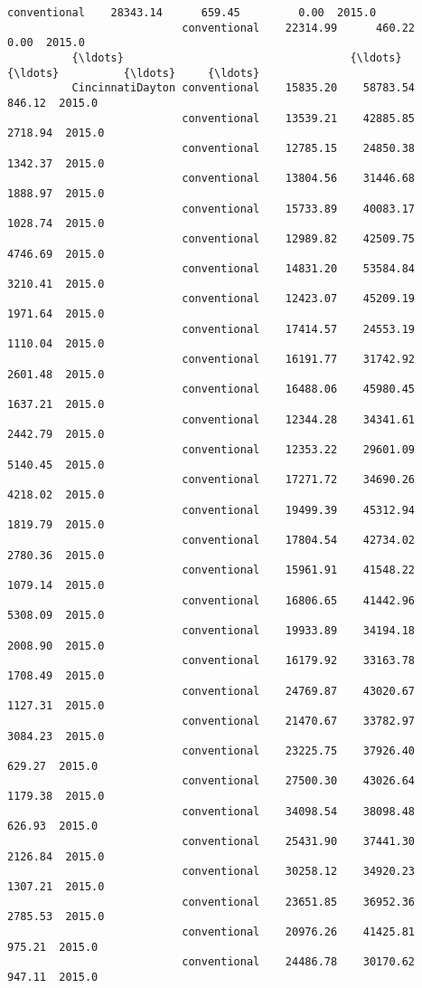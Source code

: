\documentclass[11pt]{article}
\begin{document}
\begin{Verbatim}[commandchars=\\\{\}]
                           conventional    28343.14      659.45         0.00  2015.0   
                           conventional    22314.99      460.22         0.00  2015.0   
          {\ldots}                                   {\ldots}         {\ldots}          {\ldots}     {\ldots}   
          CincinnatiDayton conventional    15835.20    58783.54       846.12  2015.0   
                           conventional    13539.21    42885.85      2718.94  2015.0   
                           conventional    12785.15    24850.38      1342.37  2015.0   
                           conventional    13804.56    31446.68      1888.97  2015.0   
                           conventional    15733.89    40083.17      1028.74  2015.0   
                           conventional    12989.82    42509.75      4746.69  2015.0   
                           conventional    14831.20    53584.84      3210.41  2015.0   
                           conventional    12423.07    45209.19      1971.64  2015.0   
                           conventional    17414.57    24553.19      1110.04  2015.0   
                           conventional    16191.77    31742.92      2601.48  2015.0   
                           conventional    16488.06    45980.45      1637.21  2015.0   
                           conventional    12344.28    34341.61      2442.79  2015.0   
                           conventional    12353.22    29601.09      5140.45  2015.0   
                           conventional    17271.72    34690.26      4218.02  2015.0   
                           conventional    19499.39    45312.94      1819.79  2015.0   
                           conventional    17804.54    42734.02      2780.36  2015.0   
                           conventional    15961.91    41548.22      1079.14  2015.0   
                           conventional    16806.65    41442.96      5308.09  2015.0   
                           conventional    19933.89    34194.18      2008.90  2015.0   
                           conventional    16179.92    33163.78      1708.49  2015.0   
                           conventional    24769.87    43020.67      1127.31  2015.0   
                           conventional    21470.67    33782.97      3084.23  2015.0   
                           conventional    23225.75    37926.40       629.27  2015.0   
                           conventional    27500.30    43026.64      1179.38  2015.0   
                           conventional    34098.54    38098.48       626.93  2015.0   
                           conventional    25431.90    37441.30      2126.84  2015.0   
                           conventional    30258.12    34920.23      1307.21  2015.0   
                           conventional    23651.85    36952.36      2785.53  2015.0   
                           conventional    20976.26    41425.81       975.21  2015.0   
                           conventional    24486.78    30170.62       947.11  2015.0   
          

\end{Verbatim}
\end{document}
